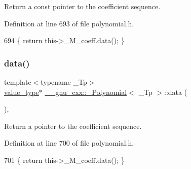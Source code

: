 Return a {\ttfamily const} pointer to the coefficient sequence. 

Definition at line 693 of file polynomial.\+h.


\begin{DoxyCode}
694       \{ \textcolor{keywordflow}{return} this->\_M\_coeff.data(); \}
\end{DoxyCode}
\mbox{\label{class____gnu__cxx_1_1__Polynomial_a6a4d5e285aaf5e40fa54274e6dee558d}} 
\subsubsection{\texorpdfstring{data()}{data()}\hspace{0.1cm}{\footnotesize\ttfamily [2/2]}}
{\footnotesize\ttfamily template$<$typename \+\_\+\+Tp$>$ \\
\hyperlink{class____gnu__cxx_1_1__Polynomial_a725563351f50e76084a7a016c06f8a53}{value\+\_\+type}$\ast$ \hyperlink{class____gnu__cxx_1_1__Polynomial}{\+\_\+\+\_\+gnu\+\_\+cxx\+::\+\_\+\+Polynomial}$<$ \+\_\+\+Tp $>$\+::data (\begin{DoxyParamCaption}{ }\end{DoxyParamCaption})\hspace{0.3cm}{\ttfamily [inline]}, {\ttfamily [noexcept]}}

Return a {\ttfamily pointer} to the coefficient sequence. 

Definition at line 700 of file polynomial.\+h.


\begin{DoxyCode}
701       \{ \textcolor{keywordflow}{return} this->\_M\_coeff.data(); \}
\end{DoxyCode}
\mbox{\label{class____gnu__cxx_1_1__Polynomial_a919fb67d8a4aa72952e6bbea7b5bc967}} 
